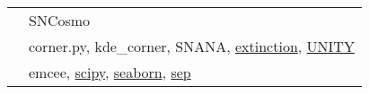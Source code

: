 \documentclass[margin]{res}
\begin{document}
\begin{resume}


\begin{tabular}{l p{4.3in}}
\hspace{-0.6em}{\bf Co-maintainer:} & SNCosmo\\
\hspace{-0.6em}{\bf Source Code:} & 
corner.py, kde\_corner, SNANA, \href{https://github.com/conda-forge/extinction-feedstock}{extinction}, \href{https://github.com/rubind/host_unity}{UNITY}\\

\hspace{-0.6em}{\bf Documentation:} & 
emcee,
\href{https://github.com/scipy/scipy/pull/8011}{scipy},
\href{https://github.com/mwaskom/seaborn/pulls?q=is\%3Apr+author\%3Abenjaminrose}{seaborn},
\href{https://github.com/kbarbary/sep/commit/612033788bcce44f110a87e1b54bb70eea9960c2}{sep}\\


\end{tabular}
\end{resume}
\end{document}

